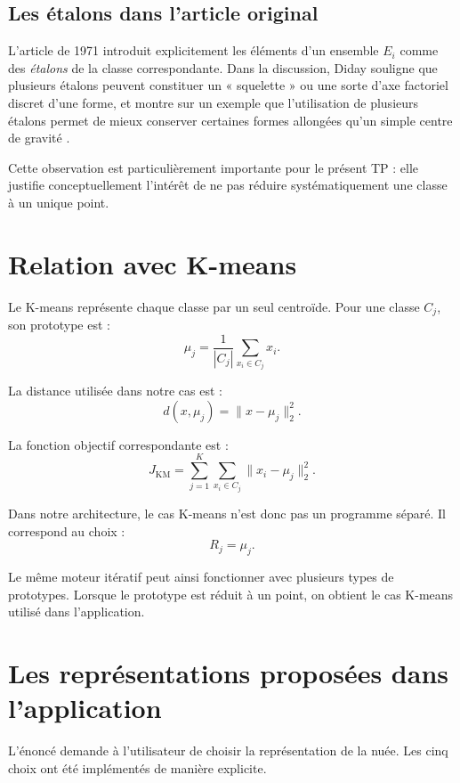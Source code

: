 \documentclass[12pt,a4paper]{article}
\begin{document}
\subsection{Les étalons dans l'article original}

L'article de 1971 introduit explicitement les éléments d'un ensemble $E_i$ comme des \textit{étalons} de la classe correspondante. Dans la discussion, Diday souligne que plusieurs étalons peuvent constituer un « squelette » ou une sorte d'axe factoriel discret d'une forme, et montre sur un exemple que l'utilisation de plusieurs étalons permet de mieux conserver certaines formes allongées qu'un simple centre de gravité \cite[p.~25]{diday1971}.

Cette observation est particulièrement importante pour le présent TP : elle justifie conceptuellement l'intérêt de ne pas réduire systématiquement une classe à un unique point.

\section{Relation avec K-means}

Le K-means représente chaque classe par un seul centroïde. Pour une classe $C_j$, son prototype est :
\[
\mu_j=\frac{1}{|C_j|}\sum_{x_i\in C_j}x_i.
\]

La distance utilisée dans notre cas est :
\[
d(x,\mu_j)=\|x-\mu_j\|_2^2.
\]

La fonction objectif correspondante est :
\[
J_{\mathrm{KM}}=
\sum_{j=1}^{K}\sum_{x_i\in C_j}
\|x_i-\mu_j\|_2^2.
\]

Dans notre architecture, le cas K-means n'est donc pas un programme séparé. Il correspond au choix :
\[
R_j=\mu_j.
\]

Le même moteur itératif peut ainsi fonctionner avec plusieurs types de prototypes. Lorsque le prototype est réduit à un point, on obtient le cas K-means utilisé dans l'application.

\section{Les représentations proposées dans l'application}

L'énoncé demande à l'utilisateur de choisir la représentation de la nuée. Les cinq choix ont été implémentés de manière explicite.
\end{document}
